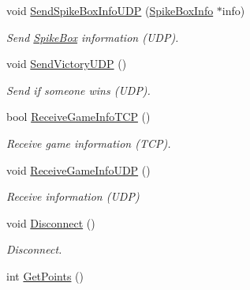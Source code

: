 \begin{DoxyCompactItemize}
void \hyperlink{class_net_work_manager_a8c5f0058427dffc0a83d2638e1047243}{Send\+Spike\+Box\+Info\+U\+DP} (\hyperlink{struct_spike_box_info}{Spike\+Box\+Info} $\ast$info)
\begin{DoxyCompactList}\small\item\em Send \hyperlink{class_spike_box}{Spike\+Box} information (U\+DP). \end{DoxyCompactList}\item 
\mbox{\label{class_net_work_manager_aed5d68e613999bb570c0509ca8038809}} 
void \hyperlink{class_net_work_manager_aed5d68e613999bb570c0509ca8038809}{Send\+Victory\+U\+DP} ()
\begin{DoxyCompactList}\small\item\em Send if someone wins (U\+DP). \end{DoxyCompactList}\item 
\mbox{\label{class_net_work_manager_a67c1538c5f1a8380ffaff311564dcd1c}} 
bool \hyperlink{class_net_work_manager_a67c1538c5f1a8380ffaff311564dcd1c}{Receive\+Game\+Info\+T\+CP} ()
\begin{DoxyCompactList}\small\item\em Receive game information (T\+CP). \end{DoxyCompactList}\item 
\mbox{\label{class_net_work_manager_af11e307eec500d888e41545fd09c4ccf}} 
void \hyperlink{class_net_work_manager_af11e307eec500d888e41545fd09c4ccf}{Receive\+Game\+Info\+U\+DP} ()
\begin{DoxyCompactList}\small\item\em Receive information (U\+DP) \end{DoxyCompactList}\item 
\mbox{\label{class_net_work_manager_a7ade75edb55c3726998d3d30e8c8fead}} 
void \hyperlink{class_net_work_manager_a7ade75edb55c3726998d3d30e8c8fead}{Disconnect} ()
\begin{DoxyCompactList}\small\item\em Disconnect. \end{DoxyCompactList}\item 
\mbox{\label{class_net_work_manager_a2dfa1d0f5846f68929986367afb2f27d}} 
int \hyperlink{class_net_work_manager_a2dfa1d0f5846f68929986367afb2f27d}{Get\+Points} ()

\end{DoxyCompactItemize}
